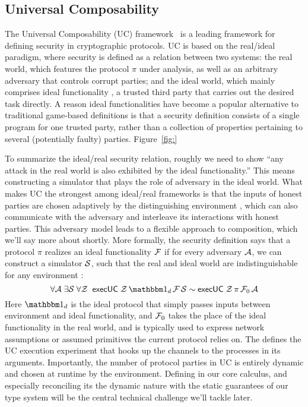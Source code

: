\subsection{Universal Composability}
The Universal Composability (UC) framework~\cite{canettiUC} is a leading framework for defining security in cryptographic protocols.
UC is based on the real/ideal paradigm, where security is defined as a relation between two systems: the real world, which features the protocol $\pi$ under analysis, as well as an arbitrary adversary \A that controls corrupt parties; and the ideal world, which mainly comprises ideal functionality \F, a trusted third party that carries out the desired task directly.
A reason ideal functionalities have become a popular alternative to traditional game-based definitions is that a security definition consists of a single program for one trusted party, rather than a collection of properties pertaining to several (potentially faulty) parties.
Figure~\ref{fig:}

To summarize the ideal/real security relation, roughly we need to show ``any attack in the real world is also exhibited by the ideal functionality.'' This means constructing a simulator \Sim that plays the role of adversary in the ideal world.
What makes UC the strongest among ideal/real frameworks is that the inputs of honest parties are chosen adaptively by the distinguishing environment \Z, which can also communicate with the adversary and interleave its interactions with honest parties.
This adversary model leads to a flexible approach to composition, which we'll say more about shortly.
More formally, the security definition says that a protocol $\pi$ realizes an ideal functionality $\mathcal{F}$
if for every adversary $\mathcal{A}$, we can construct a simulator $\mathcal{S}$, such that the real and ideal world are indistinguishable for any environment \Z:
\begin{equation}
  \label{eqn:emulation}
  \forall \A \; \exists \Sim \; \forall \Z \; \; \msf{execUC} \; \Z \, \idealP \, \F \, \Sim \sim \msf{execUC} \; \Z \, \pi \, \F_0 \, \A
\end{equation}
Here $\idealP$ is the ideal protocol that simply passes inputs between environment and ideal functionality, and $\mathcal{F}_0$ takes the place of the ideal functionality in the real world, and is typically used to express network assumptions or assumed primitives the current protocol relies on.
The  defines the UC execution experiment that hooks up the channels to the processes in its arguments.
Importantly, the number of protocol parties in UC is entirely dynamic and chosen at runtime by the environment. 
Defining  in our core calculus, and especially reconciling its the dynamic nature with the static guarantees of our type system will be the central technical challenge we'll tackle later.

